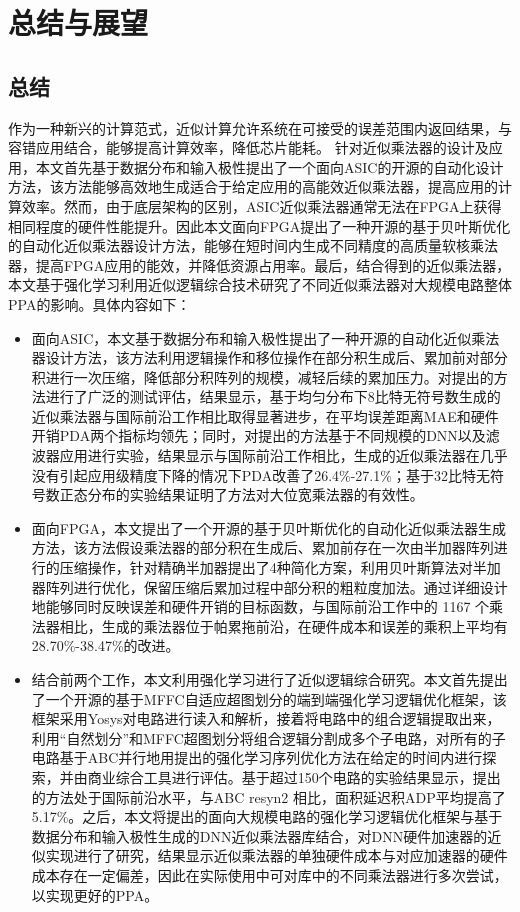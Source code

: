 \chapter{总结与展望}

\section{总结}

作为一种新兴的计算范式，近似计算允许系统在可接受的误差范围内返回结果，与容错应用结合，能够提高计算效率，降低芯片能耗。
针对近似乘法器的设计及应用，本文首先基于数据分布和输入极性提出了一个面向ASIC的开源的自动化设计方法，该方法能够高效地生成适合于给定应用的高能效近似乘法器，提高应用的计算效率。然而，由于底层架构的区别，ASIC近似乘法器通常无法在FPGA上获得相同程度的硬件性能提升。因此本文面向FPGA提出了一种开源的基于贝叶斯优化的自动化近似乘法器设计方法，能够在短时间内生成不同精度的高质量软核乘法器，提高FPGA应用的能效，并降低资源占用率。最后，结合得到的近似乘法器，本文基于强化学习利用近似逻辑综合技术研究了不同近似乘法器对大规模电路整体PPA的影响。具体内容如下：

\begin{itemize}
    \item 面向ASIC，本文基于数据分布和输入极性提出了一种开源的自动化近似乘法器设计方法，该方法利用逻辑操作和移位操作在部分积生成后、累加前对部分积进行一次压缩，降低部分积阵列的规模，减轻后续的累加压力。对提出的方法进行了广泛的测试评估，结果显示，基于均匀分布下8比特无符号数生成的近似乘法器与国际前沿工作相比取得显著进步，在平均误差距离MAE和硬件开销PDA两个指标均领先；同时，对提出的方法基于不同规模的DNN以及滤波器应用进行实验，结果显示与国际前沿工作相比，生成的近似乘法器在几乎没有引起应用级精度下降的情况下PDA改善了26.4\%-27.1\%；基于32比特无符号数正态分布的实验结果证明了方法对大位宽乘法器的有效性。

    \item 面向FPGA，本文提出了一个开源的基于贝叶斯优化的自动化近似乘法器生成方法，该方法假设乘法器的部分积在生成后、累加前存在一次由半加器阵列进行的压缩操作，针对精确半加器提出了4种简化方案，利用贝叶斯算法对半加器阵列进行优化，保留压缩后累加过程中部分积的粗粒度加法。通过详细设计地能够同时反映误差和硬件开销的目标函数，与国际前沿工作中的 1167 个乘法器相比，生成的乘法器位于帕累拖前沿，在硬件成本和误差的乘积上平均有28.70\%-38.47\%的改进。

    \item 结合前两个工作，本文利用强化学习进行了近似逻辑综合研究。本文首先提出了一个开源的基于MFFC自适应超图划分的端到端强化学习逻辑优化框架，该框架采用Yosys对电路进行读入和解析，接着将电路中的组合逻辑提取出来，利用“自然划分”和MFFC超图划分将组合逻辑分割成多个子电路，对所有的子电路基于ABC并行地用提出的强化学习序列优化方法在给定的时间内进行探索，并由商业综合工具进行评估。基于超过150个电路的实验结果显示，提出的方法处于国际前沿水平，与ABC resyn2 相比，面积延迟积ADP平均提高了5.17\%。之后，本文将提出的面向大规模电路的强化学习逻辑优化框架与基于数据分布和输入极性生成的DNN近似乘法器库结合，对DNN硬件加速器的近似实现进行了研究，结果显示近似乘法器的单独硬件成本与对应加速器的硬件成本存在一定偏差，因此在实际使用中可对库中的不同乘法器进行多次尝试，以实现更好的PPA。
\end{itemize}

